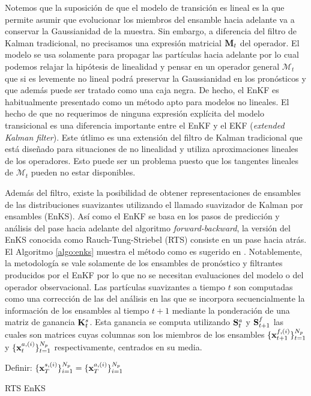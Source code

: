 Notemos que la suposición de que el modelo de transición es lineal es la que permite asumir que evolucionar los miembros del ensamble hacia adelante va a conservar la Gaussianidad de la muestra. Sin embargo, a diferencia del filtro de Kalman tradicional, no precisamos una expresión matricial $\mathbf{M}_t$ del operador. El modelo se usa solamente para propagar las partículas hacia adelante por lo cual podemos relajar la hipótesis de linealidad y pensar en un operador general $\mathcal{M}_t$ que si es levemente no lineal podrá preservar la Gaussianidad en los pronósticos y que además puede ser tratado como una caja negra. De hecho, el EnKF es habitualmente presentado como un método apto para modelos no lineales. El hecho de que no requerimos de ninguna expresión explícita del modelo transicional es una diferencia importante entre el EnKF y el EKF (\textit{extended Kalman filter}). Este útlimo es una extensión del filtro de Kalman tradicional que está diseñado para situaciones de no linealidad y utiliza aproximaciones lineales de los operadores. Esto puede ser un problema puesto que los tangentes lineales de $\mathcal{M}_t$ pueden no estar disponibles.

Además del filtro, existe la posibilidad de obtener representaciones de ensambles de las distribuciones suavizantes utilizando el llamado suavizador de Kalman por ensambles (EnKS). Así como el EnKF se basa en los pasos de predicción y análisis del pase hacia adelante del algoritmo \textit{forward-backward}, la versión del EnKS conocida como Rauch-Tung-Striebel (RTS) consiste en un pase hacia atrás. El Algoritmo \ref{algo:enks} muestra el método como es sugerido en \cite{Cosme2012}. Notablemente, la metodología se vale solamente de los ensambles de pronóstico y filtrantes producidos por el EnKF por lo que no se necesitan evaluaciones del modelo o del operador observacional. Las partículas suavizantes a tiempo $t$ son computadas como una corrección de las del análisis en las que se incorpora secuencialmente la información de los ensambles al tiempo $t+1$ mediante la ponderación de una matriz de ganancia $\mathbf{K}_t^s$. Esta ganancia se computa utilizando $\mathbf{S}_t^a$ y $\mathbf{S}_{t+1}^f$ las cuales son matrices cuyas columnas son los miembros de los ensambles $\{\mathbf{x}_{t+1}^{f, (i)}\}_{t=1}^{N_p}$ y  $\{\mathbf{x}_t^{a, (i)}\}_{t=1}^{N_p}$ respectivamente, centrados en su media.

\begin{algorithm}[H]\label{algo:enks}
    Definir: $\{\mathbf{x}_T^{s, (i)} \}_{i=1}^{N_p} = \{\mathbf{x}_T^{a, (i)} \}_{i=1}^{N_p}$
    
\caption{RTS EnKS}
\end{algorithm}

